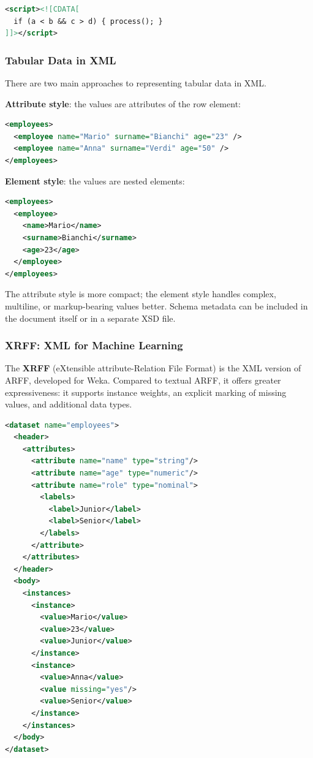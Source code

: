 \begin{lstlisting}[language=XML, basicstyle=\ttfamily\scriptsize]
<script><![CDATA[
  if (a < b && c > d) { process(); }
]]></script>
\end{lstlisting}

\subsubsection{Tabular Data in XML}
\label{subsec:xml-tabular}

There are two main approaches to representing tabular data in XML.

\textbf{Attribute style}: the values are attributes of the row element:
\begin{lstlisting}[language=XML, basicstyle=\ttfamily\scriptsize]
<employees>
  <employee name="Mario" surname="Bianchi" age="23" />
  <employee name="Anna" surname="Verdi" age="50" />
</employees>
\end{lstlisting}

\textbf{Element style}: the values are nested elements:
\begin{lstlisting}[language=XML, basicstyle=\ttfamily\scriptsize]
<employees>
  <employee>
    <name>Mario</name>
    <surname>Bianchi</surname>
    <age>23</age>
  </employee>
</employees>
\end{lstlisting}

The attribute style is more compact; the element style handles complex, multiline, or markup-bearing values better. Schema metadata can be included in the document itself or in a separate XSD file.

\subsubsection{XRFF: XML for Machine Learning}
\label{subsec:xrff-format}

The \textbf{XRFF} (eXtensible attribute-Relation File Format) is the XML version of ARFF, developed for Weka. Compared to textual ARFF, it offers greater expressiveness: it supports instance weights, an explicit marking of missing values, and additional data types.

\begin{lstlisting}[language=XML, basicstyle=\ttfamily\scriptsize]
<dataset name="employees">
  <header>
    <attributes>
      <attribute name="name" type="string"/>
      <attribute name="age" type="numeric"/>
      <attribute name="role" type="nominal">
        <labels>
          <label>Junior</label>
          <label>Senior</label>
        </labels>
      </attribute>
    </attributes>
  </header>
  <body>
    <instances>
      <instance>
        <value>Mario</value>
        <value>23</value>
        <value>Junior</value>
      </instance>
      <instance>
        <value>Anna</value>
        <value missing="yes"/>
        <value>Senior</value>
      </instance>
    </instances>
  </body>
</dataset>
\end{lstlisting}
